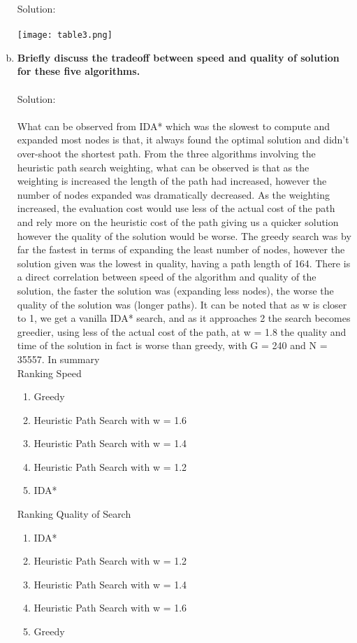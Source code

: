 \documentclass{article}
\newcommand*\fixindent{ \hspace{1pt}\\}
\begin{document}
\begin{enumerate}[a)]
    Solution:\\\\
    \texttt{[image: table3.png]}\\
    \item \textbf{Briefly discuss the tradeoff between speed and quality of solution for these five algorithms.}\fixindent{}\\
    Solution:\\\\
    What can be observed from IDA* which was the slowest to compute and expanded most nodes is that, it always found the optimal solution and didn’t over-shoot the shortest path. From the three algorithms involving the heuristic path search weighting, what can be observed is that as the weighting is increased the length of the path had increased, however the number of nodes expanded was dramatically decreased. As the weighting increased, the evaluation cost would use less of the actual cost of the path and rely more on the heuristic cost of the path giving us a quicker solution however the quality of the solution would be worse. The greedy search was by far the fastest in terms of expanding the least number of nodes, however the solution given was the lowest in quality, having a path length of 164. There is a direct correlation between speed of the algorithm and quality of the solution, the faster the solution was (expanding less nodes), the worse the quality of the solution was (longer paths). It can be noted that as w is closer to 1, we get a vanilla IDA* search, and as it approaches 2 the search becomes greedier, using less of the actual cost of the path, at w = 1.8 the quality and time of the solution in fact is worse than greedy, with G = 240 and N = 35557. In summary\\
    Ranking Speed
    \begin{enumerate}[1.]
        \item Greedy
        \item Heuristic Path Search with w = 1.6
        \item Heuristic Path Search with w = 1.4
        \item Heuristic Path Search with w = 1.2
        \item IDA*
    \end{enumerate}
    Ranking Quality of Search
    \begin{enumerate}[1.]
        \item IDA*
        \item Heuristic Path Search with w = 1.2
        \item Heuristic Path Search with w = 1.4
        \item Heuristic Path Search with w = 1.6
        \item Greedy
    \end{enumerate}


\end{enumerate}
\end{document}
